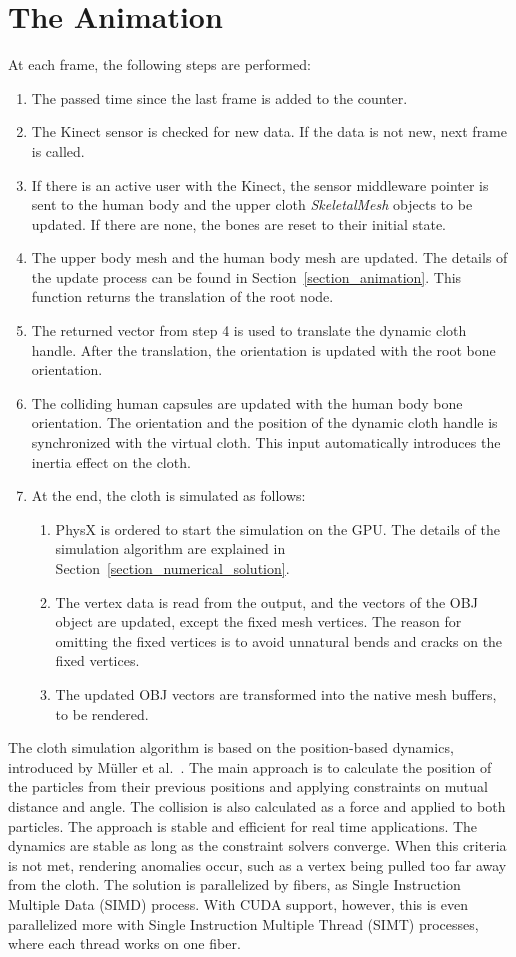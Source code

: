 \section{The Animation}
At each frame, the following steps are performed:
\begin{enumerate}
\item The passed time since the last frame is added to the counter.
\item The Kinect sensor is checked for new data. If the data is not new, next frame is called. 
\item If there is an active user with the Kinect, the sensor middleware pointer is sent to the human body and the upper cloth {\em SkeletalMesh} objects to be updated. If there are none, the bones are reset to their initial state.
\item The upper body mesh and the human body mesh are updated. The details of the update process can be found in Section~\ref{section_animation}. This function returns the translation of the root node. 
\item The returned vector from step 4 is used to translate the dynamic cloth handle. After the translation, the orientation is  updated with the root bone orientation.
\item The colliding human capsules are updated with the human body bone orientation. The orientation and the position of the dynamic cloth handle is synchronized with the virtual cloth. This input automatically introduces the inertia effect on the cloth.
\item At the end, the cloth is simulated as follows:
\begin{enumerate}
\item PhysX is ordered to start the simulation on the GPU. The details of the simulation algorithm are explained in Section~\ref{section_numerical_solution}.
\item The vertex data is read from the output, and the vectors of the OBJ object are updated, except the fixed mesh vertices. The reason for omitting the fixed vertices is to avoid unnatural bends and cracks on the fixed vertices.
  \item The updated OBJ vectors are transformed into the native mesh buffers, to be rendered. 
\end{enumerate}
\end{enumerate}

The cloth simulation algorithm is based on the position-based dynamics, introduced by M{\"u}ller et al.~\cite{Muller2007}. The main approach is to calculate the position of the particles from their previous positions and applying constraints on mutual distance and angle. The collision is also calculated as a force and applied to both particles. The approach is stable and efficient for real time applications. The dynamics are stable as long as the constraint solvers converge. When this criteria is not met, rendering anomalies occur, such as a vertex being pulled too far away from the cloth. The solution is parallelized by fibers, as Single Instruction Multiple Data (SIMD) process. With CUDA support, however, this is even parallelized more with Single Instruction Multiple Thread (SIMT) processes, where each thread works on one fiber.

